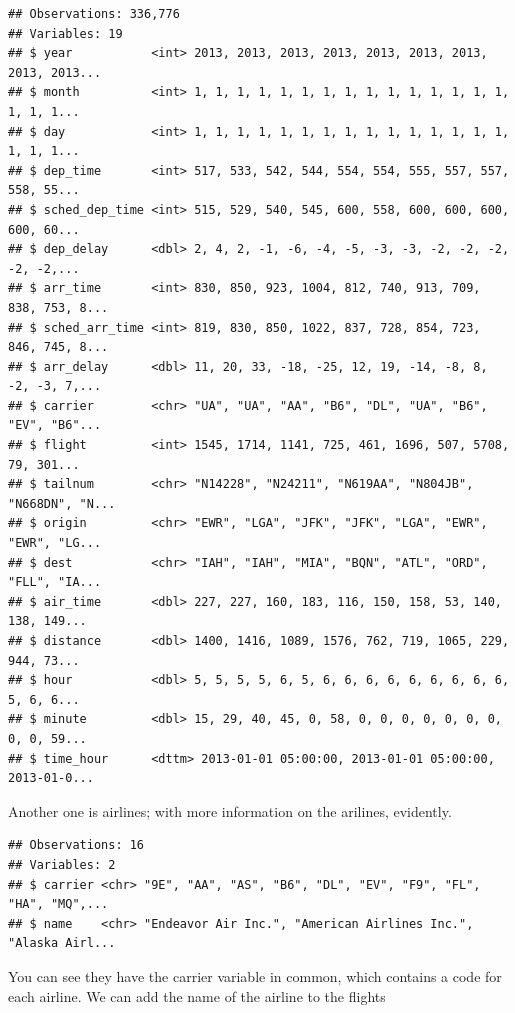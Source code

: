 \documentclass[]{tufte-book}
\newenvironment{Shaded}{}{}
\newcommand{\NormalTok}[1]{#1}
\newcommand{\OperatorTok}[1]{\textcolor[rgb]{0.40,0.40,0.40}{#1}}
\newcommand{\StringTok}[1]{\textcolor[rgb]{0.25,0.44,0.63}{#1}}
\begin{document}
\begin{verbatim}
## Observations: 336,776
## Variables: 19
## $ year           <int> 2013, 2013, 2013, 2013, 2013, 2013, 2013, 2013, 2013...
## $ month          <int> 1, 1, 1, 1, 1, 1, 1, 1, 1, 1, 1, 1, 1, 1, 1, 1, 1, 1...
## $ day            <int> 1, 1, 1, 1, 1, 1, 1, 1, 1, 1, 1, 1, 1, 1, 1, 1, 1, 1...
## $ dep_time       <int> 517, 533, 542, 544, 554, 554, 555, 557, 557, 558, 55...
## $ sched_dep_time <int> 515, 529, 540, 545, 600, 558, 600, 600, 600, 600, 60...
## $ dep_delay      <dbl> 2, 4, 2, -1, -6, -4, -5, -3, -3, -2, -2, -2, -2, -2,...
## $ arr_time       <int> 830, 850, 923, 1004, 812, 740, 913, 709, 838, 753, 8...
## $ sched_arr_time <int> 819, 830, 850, 1022, 837, 728, 854, 723, 846, 745, 8...
## $ arr_delay      <dbl> 11, 20, 33, -18, -25, 12, 19, -14, -8, 8, -2, -3, 7,...
## $ carrier        <chr> "UA", "UA", "AA", "B6", "DL", "UA", "B6", "EV", "B6"...
## $ flight         <int> 1545, 1714, 1141, 725, 461, 1696, 507, 5708, 79, 301...
## $ tailnum        <chr> "N14228", "N24211", "N619AA", "N804JB", "N668DN", "N...
## $ origin         <chr> "EWR", "LGA", "JFK", "JFK", "LGA", "EWR", "EWR", "LG...
## $ dest           <chr> "IAH", "IAH", "MIA", "BQN", "ATL", "ORD", "FLL", "IA...
## $ air_time       <dbl> 227, 227, 160, 183, 116, 150, 158, 53, 140, 138, 149...
## $ distance       <dbl> 1400, 1416, 1089, 1576, 762, 719, 1065, 229, 944, 73...
## $ hour           <dbl> 5, 5, 5, 5, 6, 5, 6, 6, 6, 6, 6, 6, 6, 6, 6, 5, 6, 6...
## $ minute         <dbl> 15, 29, 40, 45, 0, 58, 0, 0, 0, 0, 0, 0, 0, 0, 0, 59...
## $ time_hour      <dttm> 2013-01-01 05:00:00, 2013-01-01 05:00:00, 2013-01-0...
\end{verbatim}

Another one is airlines; with more information on the arilines, evidently.

\begin{Shaded}
\end{Shaded}

\begin{verbatim}
## Observations: 16
## Variables: 2
## $ carrier <chr> "9E", "AA", "AS", "B6", "DL", "EV", "F9", "FL", "HA", "MQ",...
## $ name    <chr> "Endeavor Air Inc.", "American Airlines Inc.", "Alaska Airl...
\end{verbatim}

You can see they have the carrier variable in common, which contains a code for each airline. We can add the name of the airline to the flights
\end{document}

